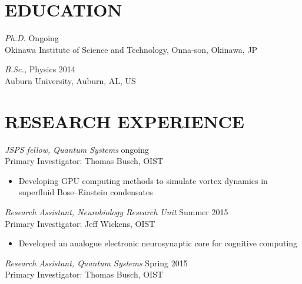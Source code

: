 \documentclass[margin, 10pt, a4paper]{res} %
\begin{document}
\begin{resume}
\vspace{-6mm}


\section{EDUCATION}
{\sl Ph.D.} \hfill Ongoing\\
Okinawa Institute of Science and Technology, Onna-son, Okinawa, JP

{\sl B.Sc.,} Physics \hfill 2014\\
Auburn University, Auburn, AL, US 

 
 
\section{RESEARCH EXPERIENCE}

{\sl JSPS fellow, Quantum Systems} \hfill ongoing \\
Primary Investigator: Thomas Busch, OIST

\begin{itemize}[label = {}] \itemsep -2pt %
\item Developing GPU computing methods to simulate vortex dynamics in superfluid Bose--Einstein condensates
\end{itemize}

{\sl Research Assistant, Neurobiology Research Unit} \hfill Summer 2015 \\
Primary Investigator: Jeff Wickens, OIST

\begin{itemize}[label = {}] \itemsep -2pt %
\item Developed an analogue electronic neurosynaptic core for cognitive computing
\end{itemize}

{\sl Research Assistant, Quantum Systems} \hfill Spring 2015 \\
Primary Investigator: Thomas Busch, OIST


\end{resume}
\end{document}
